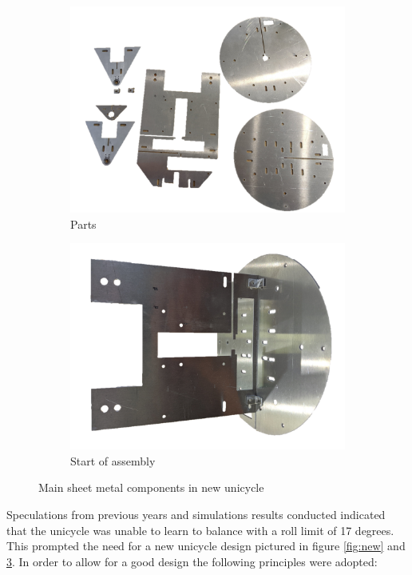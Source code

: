 \documentclass[twoside,twocolumn,12pt]{article}
\begin{document}
\begin{figure}[t!]
  \centering
  \begin{subfigure}[t]{\textwidth}
    \includegraphics[width=\linewidth]{partst}
   \caption{Parts}
  \label{sub:parts}
  \end{subfigure}  
  \newline  
  \begin{subfigure}[t]{0.6\textwidth}
    \includegraphics[width=\linewidth]{buildt}
    \caption{Start of assembly}
  \label{sub:con}
  \end{subfigure}
  
  \caption{Main sheet metal components in new unicycle }
  \label{fig:parts}
\end{figure}
\clearpage
{}%
Speculations from previous years and simulations results conducted indicated that the unicycle was unable to learn to balance with a roll limit of 17 degrees. This prompted the need for a new unicycle design pictured in figure \ref{fig:new} and \ref{fig:parts}. In order to allow for a good design the following principles were adopted:
\end{document}
